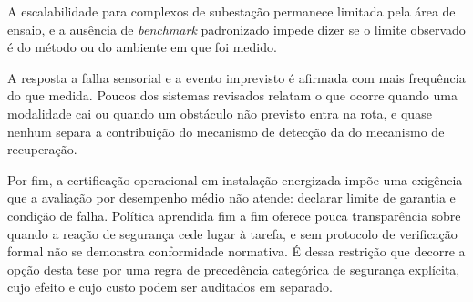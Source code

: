 A escalabilidade para complexos de subestação permanece limitada pela área de ensaio, e a ausência de \textit{benchmark} padronizado impede dizer se o limite observado é do método ou do ambiente em que foi medido.

A resposta a falha sensorial e a evento imprevisto é afirmada com mais frequência do que medida. Poucos dos sistemas revisados relatam o que ocorre quando uma modalidade cai ou quando um obstáculo não previsto entra na rota, e quase nenhum separa a contribuição do mecanismo de detecção da do mecanismo de recuperação.

Por fim, a certificação operacional em instalação energizada impõe uma exigência que a avaliação por desempenho médio não atende: declarar limite de garantia e condição de falha. Política aprendida fim a fim oferece pouca transparência sobre quando a reação de segurança cede lugar à tarefa, e sem protocolo de verificação formal não se demonstra conformidade normativa. É dessa restrição que decorre a opção desta tese por uma regra de precedência categórica de segurança explícita, cujo efeito e cujo custo podem ser auditados em separado.

